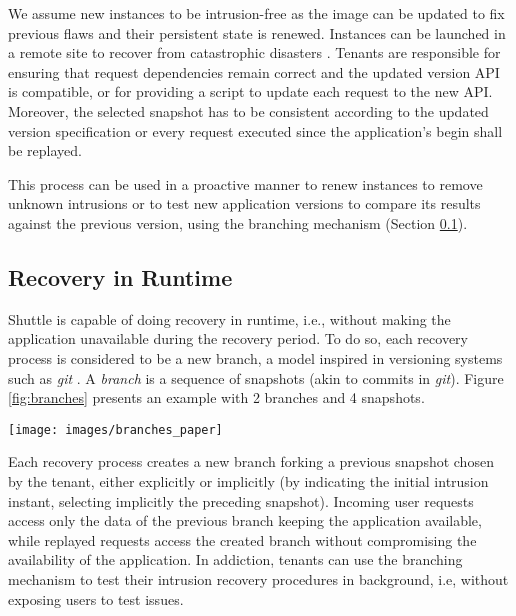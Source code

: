 \documentclass[10pt,conference]{IEEEtran}
\newcommand{\LONG}[1]{}
\begin{document}
We assume new instances to be intrusion-free as the image can be updated to fix previous flaws and their persistent state is renewed. Instances can be launched in a remote site to recover from catastrophic disasters \cite{cloud-disaster}. Tenants are responsible for ensuring that request dependencies remain correct and the updated version API is compatible, or for providing a script to update each request to the new API. Moreover, the selected snapshot has to be consistent according to the updated version specification or every request executed since the application's begin shall be replayed.

This process can be used in a proactive manner to renew instances to remove unknown intrusions \LONG{cite{Castro2002}}\cite{Sousa2010} or to test new application versions to compare its results against the previous version, using the branching mechanism (Section \ref{sec:recovery:runtime_recovery}).


\subsection{Recovery in Runtime}
\label{sec:recovery:runtime_recovery}
Shuttle is capable of doing recovery in runtime, i.e., without making the application unavailable during the recovery period. To do so, each recovery process is considered to be a new branch, a model inspired in versioning systems such as \emph{git} \cite{git}. A \emph{branch} is a sequence of snapshots (akin to commits in \emph{git}). Figure \ref{fig:branches} presents an example with 2 branches and 4 snapshots.

\begin{SCfigure}
  \centering
  \texttt{[image: images/branches\_paper]}
  \caption{\footnotesize{Tree model:} 2 branches and 4 snapshots: branch 1 contains snapshots A,B,C; Branch 2 contains snapshots A,B,D.}   \label{fig:branches}
\end{SCfigure}

Each recovery process creates a new branch forking a previous snapshot chosen by the tenant, either explicitly or implicitly (by indicating the initial intrusion instant, selecting implicitly the preceding snapshot). Incoming user requests access only the data of the previous branch keeping the application available, while replayed requests access the created branch without compromising the availability of the application. In addiction, tenants can use the branching mechanism to test their intrusion recovery procedures in background, i.e, without exposing users to test issues.
\end{document}
